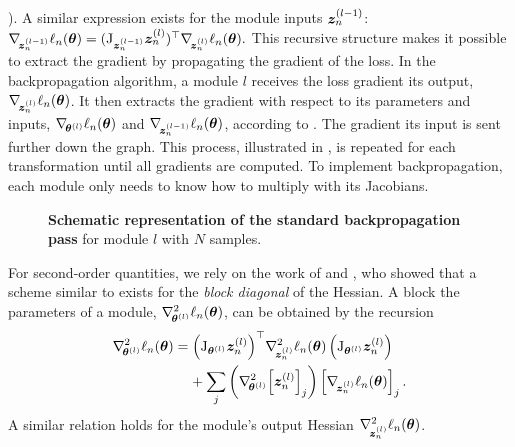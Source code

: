 ). A similar expression exists for
the module inputs ${\bm{z}}_n^{(l-1)}$: $ \nabla_{\!{{\bm{z}}_n^{(l-1)}}}\ell_n({\bm{\theta}}) =
(\mathrm{J}_{{\bm{z}}_n^{(l-1)}} {\bm{z}}_n^{(l)})^\top \nabla_{\!{{\bm{z}}_n^{(l)}}}\ell_n({\bm{\theta}}). $
This recursive structure makes it possible to extract the gradient by
propagating the gradient of the loss. In the backpropagation algorithm, a module
$l$ receives the loss gradient \wrt its output,
$\nabla_{\!{{\bm{z}}_n^{(l)}}}\ell_n({\bm{\theta}})$. It then extracts the gradient with respect
to its parameters and inputs, $\nabla_{\!{{\bm{\theta}}^{(l)}}}\ell_n({\bm{\theta}})$ and
$\nabla_{\!{{\bm{z}}_n^{(l-1)}}}\ell_n({\bm{\theta}})$, according to
. The gradient \wrt its input is sent
further down the graph. This process, illustrated in
, is repeated for each transformation
until all gradients are computed. To implement backpropagation, each module only
needs to know how to multiply with its Jacobians.

\begin{figure}[!t]
  \centering
  \tikzexternalenable%
  
  \tikzexternaldisable%
  \caption{\textbf{Schematic representation of the standard backpropagation
      pass} for module $l$ with $N$
    samples.}\label{backpack::fig:backprop-gradient}
\end{figure}

For second-order quantities, we rely on the work of
\citet{mizutani2008secondorder} and \citet{dangel2020modular}, who showed that a
scheme similar to  exists for the
\emph{block diagonal} of the Hessian. A block \wrt the parameters of
a module, $\nabla_{\!{{\bm{\theta}}^{(l)}}}^{2}\ell_n({\bm{\theta}})$, can be obtained by the
recursion
\begin{equation}
  \begin{split}
    \nabla_{\!{{\bm{\theta}}^{(l)}}}^{2}\ell_n({\bm{\theta}})
    &=
    {\left(\mathrm{J}_{{\bm{\theta}}^{(l)}} {\bm{z}}_n^{(l)}\right)}^\top
    \nabla_{\!{{\bm{z}}_n^{(l)}}}^{2}\ell_n({\bm{\theta}})
    \left(\mathrm{J}_{{\bm{\theta}}^{(l)}} {\bm{z}}_n^{(l)}\right)
    \\
    &\phantom{=}\
    + \sum_j
    \left(\nabla_{\!{{\bm{\theta}}^{(l)}}}^{2} {\left[{\bm{z}}_n^{(l)}\right]}_j\right)
    {\left[ \nabla_{\!{{\bm{z}}_n^{(l)}}}\ell_n({\bm{\theta}}) \right]}_j\,{.}
  \end{split}
  \label{backpack::eq:backprop_hessian}
\end{equation}
A similar relation holds for the module's output Hessian
$\nabla_{\!{{\bm{z}}_n^{(l)}}}^{2} \ell_n({\bm{\theta}})$.

